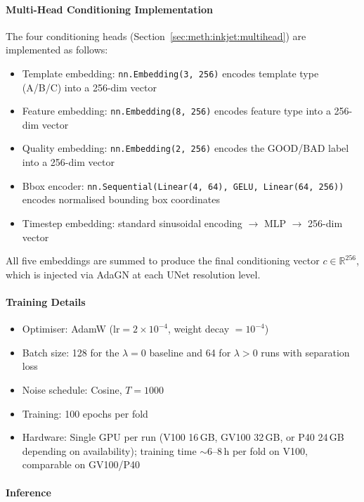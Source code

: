 \paragraph{Multi-Head Conditioning Implementation}

The four conditioning heads (Section~\ref{sec:meth:inkjet:multihead}) are implemented as follows:
\begin{itemize}
\item Template embedding: \texttt{nn.Embedding(3, 256)} encodes template type (A/B/C) into a 256-dim vector
\item Feature embedding: \texttt{nn.Embedding(8, 256)} encodes feature type into a 256-dim vector
\item Quality embedding: \texttt{nn.Embedding(2, 256)} encodes the GOOD/BAD label into a 256-dim vector
\item Bbox encoder: \texttt{nn.Sequential(Linear(4, 64), GELU, Linear(64, 256))} encodes normalised bounding box coordinates
\item Timestep embedding: standard sinusoidal encoding $\to$ MLP $\to$ 256-dim vector
\end{itemize}

All five embeddings are summed to produce the final conditioning vector $c \in \mathbb{R}^{256}$, which is injected via AdaGN at each UNet resolution level.

\paragraph{Training Details}
\begin{itemize}
\item Optimiser: AdamW ($\text{lr} = 2 \times 10^{-4}$, weight decay $= 10^{-4}$)
\item Batch size: 128 for the $\lambda=0$ baseline and 64 for $\lambda>0$ runs with separation loss
\item Noise schedule: Cosine, $T = 1000$
\item Training: 100 epochs per fold
\item Hardware: Single GPU per run (V100 16\,GB, GV100 32\,GB, or P40 24\,GB depending on availability); training time $\sim$6--8\,h per fold on V100, comparable on GV100/P40
\end{itemize}

\paragraph{Inference}

